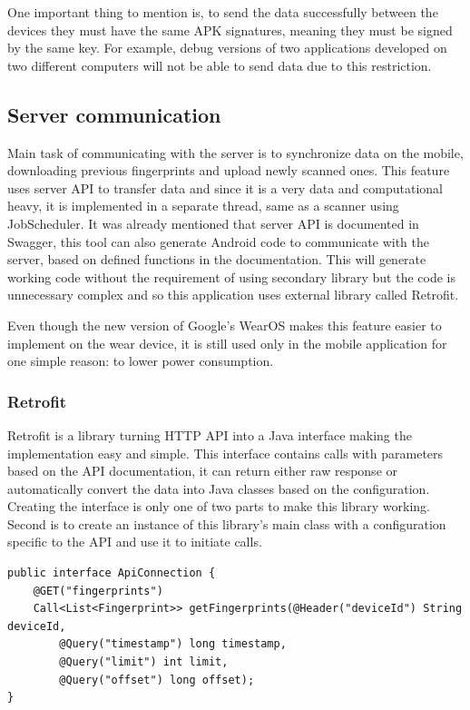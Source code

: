 One important thing to mention is, to send the data successfully between the devices they must have the same APK signatures, meaning they must be signed by the same key. For example, debug versions of two applications developed on two different computers will not be able to send data due to this restriction.

\subsection{Server communication}\label{subsec:ServerCommunication}
Main task of communicating with the server is to synchronize data on the mobile, downloading previous fingerprints and upload newly scanned ones. This feature uses server API to transfer data and since it is a very data and computational heavy, it is implemented in a separate thread, same as a scanner using JobScheduler. It was already mentioned that server API is documented in Swagger, this tool can also generate Android code to communicate with the server, based on defined functions in the documentation. This will generate working code without the requirement of using secondary library but the code is unnecessary complex and so this application uses external library called Retrofit.

Even though the new version of Google's WearOS makes this feature easier to implement on the wear device, it is still used only in the mobile application for one simple reason: to lower power consumption. 

\subsubsection{Retrofit}\label{subsec:Retrofit}
Retrofit is a library turning HTTP API into a Java interface making the implementation easy and simple. This interface contains calls with parameters based on the API documentation, it can return either raw response or automatically convert the data into Java classes based on the configuration. Creating the interface is only one of two parts to make this library working. Second is to create an instance of this library's main class with a configuration specific to the API and use it to initiate calls.

\begin{lstlisting}[caption=Retrofit interface example]
public interface ApiConnection {
	@GET("fingerprints")
	Call<List<Fingerprint>> getFingerprints(@Header("deviceId") String deviceId,
		@Query("timestamp") long timestamp,
		@Query("limit") int limit,
		@Query("offset") long offset);
}
\end{lstlisting}

